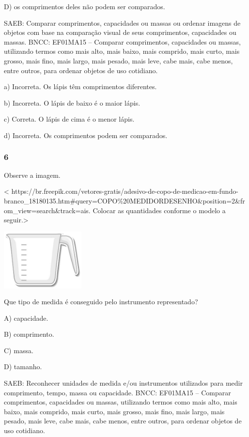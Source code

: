 D) os comprimentos deles não podem ser comparados.

SAEB: Comparar comprimentos, capacidades ou massas ou ordenar
imagens de objetos com base na comparação visual de seus comprimentos,
capacidades ou massas.
BNCC: EF01MA15 -- Comparar comprimentos, capacidades ou massas,
utilizando termos como mais alto, mais baixo, mais comprido, mais curto,
mais grosso, mais fino, mais largo, mais pesado, mais leve, cabe mais,
cabe menos, entre outros, para ordenar objetos de uso cotidiano.

a) Incorreta. Os lápis têm comprimentos diferentes.

b) Incorreta. O lápis de baixo é o maior lápis.

c) Correta. O lápis de cima é o menor lápis.

d) Incorreta. Os comprimentos podem ser comparados.

\subsubsection{6}\label{section-92}

Observe a imagem.

\textless{}
https://br.freepik.com/vetores-gratis/adesivo-de-copo-de-medicao-em-fundo-branco\_18180135.htm\#query=COPO\%20MEDIDORDESENHO\&position=2\&from\_view=search\&track=ais.
Colocar as quantidades conforme o modelo a seguir.\textgreater{}

\includegraphics[width=1.66282in,height=1.21657in]{media/image107.jpg}

Que tipo de medida é conseguido pelo instrumento representado?

A) capacidade.

B) comprimento.

C) massa.

D) tamanho.

SAEB: Reconhecer unidades de medida e/ou instrumentos utilizados
para medir comprimento, tempo, massa ou capacidade.
BNCC: EF01MA15 -- Comparar comprimentos, capacidades ou massas,
utilizando termos como mais alto, mais baixo, mais comprido, mais curto,
mais grosso, mais fino, mais largo, mais pesado, mais leve, cabe mais,
cabe menos, entre outros, para ordenar objetos de uso cotidiano.

